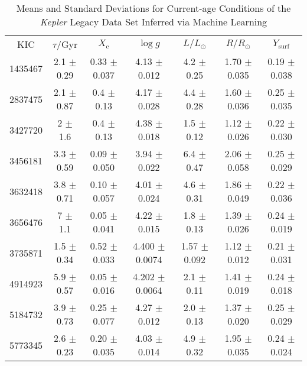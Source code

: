 \begin{table*}
    \centering
    \caption{Means and Standard Deviations for Current-age Conditions of the \emph{Kepler} Legacy Data Set Inferred via Machine Learning}
    \label{tab:1}
    \fontsize{8}{9.5}\selectfont%
    \begin{tabular}{c|cccccc}
        \hline\noalign{\smallskip}
        KIC & $\tau/$Gyr & $X_{\mathrm{c}}$ & $\log g$ & $L/L_\odot$ & $R/R_\odot$ & $Y_{\mathrm{surf}}$ \\
        \noalign{\smallskip}\hline\noalign{\smallskip}
1435467  &        2.1    $\pm$  0.29   &      0.33   $\pm$  0.037  &      4.13   $\pm$  0.012  &      4.2    $\pm$  0.25   &      1.70   $\pm$  0.035  &      0.19   $\pm$  0.038    \\
2837475  &        2.1    $\pm$  0.87   &      0.4    $\pm$  0.13   &      4.17   $\pm$  0.028  &      4.4    $\pm$  0.28   &      1.60   $\pm$  0.036  &      0.25   $\pm$  0.035    \\
3427720  &        2      $\pm$  1.6    &      0.4    $\pm$  0.13   &      4.38   $\pm$  0.018  &      1.5    $\pm$  0.12   &      1.12   $\pm$  0.026  &      0.22   $\pm$  0.030    \\
3456181  &        3.3    $\pm$  0.59   &      0.09   $\pm$  0.050  &      3.94   $\pm$  0.022  &      6.4    $\pm$  0.47   &      2.06   $\pm$  0.058  &      0.25   $\pm$  0.029    \\
3632418  &        3.8    $\pm$  0.71   &      0.10   $\pm$  0.057  &      4.01   $\pm$  0.024  &      4.6    $\pm$  0.31   &      1.86   $\pm$  0.049  &      0.22   $\pm$  0.036    \\
3656476  &        7      $\pm$  1.1    &      0.05   $\pm$  0.041  &      4.22   $\pm$  0.015  &      1.8    $\pm$  0.13   &      1.39   $\pm$  0.026  &      0.24   $\pm$  0.019    \\
3735871  &        1.5    $\pm$  0.34   &      0.52   $\pm$  0.033  &      4.400  $\pm$  0.0074 &      1.57   $\pm$  0.092  &      1.12   $\pm$  0.012  &      0.21   $\pm$  0.031    \\
4914923  &        5.9    $\pm$  0.57   &      0.05   $\pm$  0.016  &      4.202  $\pm$  0.0064 &      2.1    $\pm$  0.11   &      1.41   $\pm$  0.019  &      0.24   $\pm$  0.018    \\
5184732  &        3.9    $\pm$  0.73   &      0.25   $\pm$  0.077  &      4.27   $\pm$  0.012  &      2.0    $\pm$  0.13   &      1.37   $\pm$  0.020  &      0.25   $\pm$  0.029    \\
5773345  &        2.6    $\pm$  0.23   &      0.20   $\pm$  0.035  &      4.03   $\pm$  0.014  &      4.9    $\pm$  0.32   &      1.95   $\pm$  0.035  &      0.24   $\pm$  0.024    \\

\end{tabular}
\end{table*}
